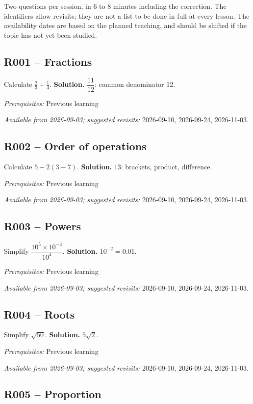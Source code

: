 \label{AUTO}
Two questions per session, in 6 to 8 minutes including the correction. The identifiers allow revisits; they are not a list to be done in full at every lesson. The availability dates are based on the planned teaching, and should be shifted if the topic has not yet been studied.
\subsection*{R001 -- Fractions}\label{R001}
Calculate $\frac23+\frac14$.
\ifmxteacher\textbf{Solution.} $\dfrac{11}{12}$: common denominator 12.\par\textit{Prerequisites:} Previous learning\par\textit{Available from 2026-09-03; suggested revisits:} 2026-09-10, 2026-09-24, 2026-11-03.\fi
{}\subsection*{R002 -- Order of operations}\label{R002}
Calculate $5-2(3-7)$.
\ifmxteacher\textbf{Solution.} $13$: brackets, product, difference.\par\textit{Prerequisites:} Previous learning\par\textit{Available from 2026-09-03; suggested revisits:} 2026-09-10, 2026-09-24, 2026-11-03.\fi
{}\subsection*{R003 -- Powers}\label{R003}
Simplify $\dfrac{10^5\times 10^{-3}}{10^4}$.
\ifmxteacher\textbf{Solution.} $10^{-2}=\num{0,01}$.\par\textit{Prerequisites:} Previous learning\par\textit{Available from 2026-09-03; suggested revisits:} 2026-09-10, 2026-09-24, 2026-11-03.\fi
{}\subsection*{R004 -- Roots}\label{R004}
Simplify $\sqrt{50}$.
\ifmxteacher\textbf{Solution.} $5\sqrt2$.\par\textit{Prerequisites:} Previous learning\par\textit{Available from 2026-09-03; suggested revisits:} 2026-09-10, 2026-09-24, 2026-11-03.\fi
{}\subsection*{R005 -- Proportion}\label{R005}
